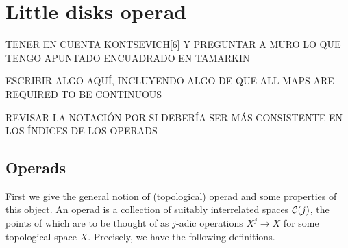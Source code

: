 \documentclass[TFM.tex]{subfiles}
\begin{document}
\chapter{Little disks operad}
TENER EN CUENTA KONTSEVICH[6] Y PREGUNTAR A MURO LO QUE TENGO APUNTADO ENCUADRADO EN TAMARKIN

ESCRIBIR ALGO AQUÍ, INCLUYENDO ALGO DE QUE ALL MAPS ARE REQUIRED TO BE CONTINUOUS

REVISAR LA NOTACIÓN POR SI DEBERÍA SER MÁS CONSISTENTE EN LOS ÍNDICES DE LOS OPERADS


\section{Operads}
First we give the general notion of (topological) operad and some properties of this object.
%
An operad is a collection of suitably interrelated spaces $\mathcal{C}(j)$, the points of which are to
be thought of as $j$-adic operations $X^j \to X$ for some topological space $X$. Precisely, we have the following definitions.
\end{document}
